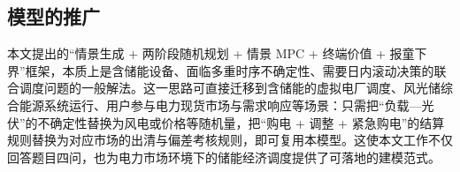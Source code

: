 \subsection{模型的推广}

本文提出的“情景生成 + 两阶段随机规划 + 情景 MPC + 终端价值 + 报童下界”框架，本质上是含储能设备、面临多重时序不确定性、需要日内滚动决策的联合调度问题的一般解法。这一思路可直接迁移到含储能的虚拟电厂调度、风光储综合能源系统运行、用户参与电力现货市场与需求响应等场景：只需把“负载—光伏”的不确定性替换为风电或价格等随机量，把“购电 + 调整 + 紧急购电”的结算规则替换为对应市场的出清与偏差考核规则，即可复用本模型。这使本文工作不仅回答题目四问，也为电力市场环境下的储能经济调度提供了可落地的建模范式。
